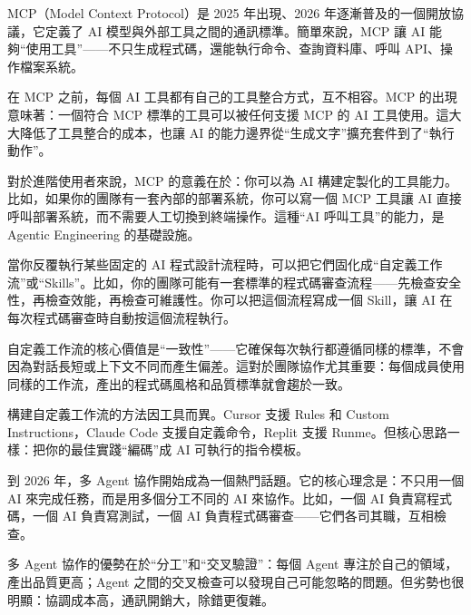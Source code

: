 


MCP（Model Context Protocol）是 2025 年出現、2026 年逐漸普及的一個開放協議，它定義了 AI 模型與外部工具之間的通訊標準。簡單來說，MCP 讓 AI 能夠“使用工具”——不只生成程式碼，還能執行命令、查詢資料庫、呼叫 API、操作檔案系統。

在 MCP 之前，每個 AI 工具都有自己的工具整合方式，互不相容。MCP 的出現意味著：一個符合 MCP 標準的工具可以被任何支援 MCP 的 AI 工具使用。這大大降低了工具整合的成本，也讓 AI 的能力邊界從“生成文字”擴充套件到了“執行動作”。

對於進階使用者來說，MCP 的意義在於：你可以為 AI 構建定製化的工具能力。比如，如果你的團隊有一套內部的部署系統，你可以寫一個 MCP 工具讓 AI 直接呼叫部署系統，而不需要人工切換到終端操作。這種“AI 呼叫工具”的能力，是 Agentic Engineering 的基礎設施。


當你反覆執行某些固定的 AI 程式設計流程時，可以把它們固化成“自定義工作流”或“Skills”。比如，你的團隊可能有一套標準的程式碼審查流程——先檢查安全性，再檢查效能，再檢查可維護性。你可以把這個流程寫成一個 Skill，讓 AI 在每次程式碼審查時自動按這個流程執行。

自定義工作流的核心價值是“一致性”——它確保每次執行都遵循同樣的標準，不會因為對話長短或上下文不同而產生偏差。這對於團隊協作尤其重要：每個成員使用同樣的工作流，產出的程式碼風格和品質標準就會趨於一致。

構建自定義工作流的方法因工具而異。Cursor 支援 Rules 和 Custom Instructions，Claude Code 支援自定義命令，Replit 支援 Runme。但核心思路一樣：把你的最佳實踐“編碼”成 AI 可執行的指令模板。


到 2026 年，多 Agent 協作開始成為一個熱門話題。它的核心理念是：不只用一個 AI 來完成任務，而是用多個分工不同的 AI 來協作。比如，一個 AI 負責寫程式碼，一個 AI 負責寫測試，一個 AI 負責程式碼審查——它們各司其職，互相檢查。

多 Agent 協作的優勢在於“分工”和“交叉驗證”：每個 Agent 專注於自己的領域，產出品質更高；Agent 之間的交叉檢查可以發現自己可能忽略的問題。但劣勢也很明顯：協調成本高，通訊開銷大，除錯更復雜。

